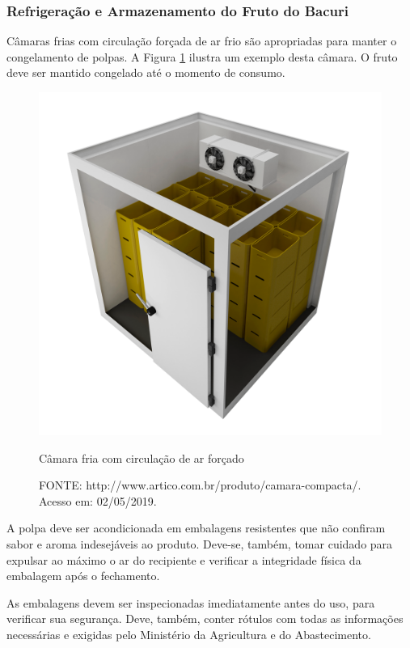 \documentclass[10pt,a4paper]{article}
\begin{document}
\subsubsection{{ Refrigeração e Armazenamento do Fruto do Bacuri}}

Câmaras frias com circulação forçada de ar frio são apropriadas para manter o congelamento de polpas. A Figura \ref{camara} ilustra um exemplo desta câmara. O fruto deve ser mantido congelado até o momento de consumo.

\begin{figure}[h!]
    \centering
    \includegraphics [scale=0.25] {Figuras/camara.png}
    \caption{Câmara fria com circulação de ar forçado}
    \caption*{FONTE: http://www.artico.com.br/produto/camara-compacta/. Acesso em: 02/05/2019.}
    \label{camara}
\end{figure}

A polpa deve ser acondicionada em embalagens resistentes que não confiram sabor e aroma indesejáveis ao produto. Deve-se, também, tomar cuidado para expulsar ao máximo o ar do recipiente e verificar a integridade física da embalagem após o fechamento.

As embalagens devem ser inspecionadas imediatamente antes do uso, para verificar sua segurança. Deve, também, conter rótulos com todas as informações necessárias e exigidas pelo Ministério da Agricultura e do Abastecimento.
\end{document}
